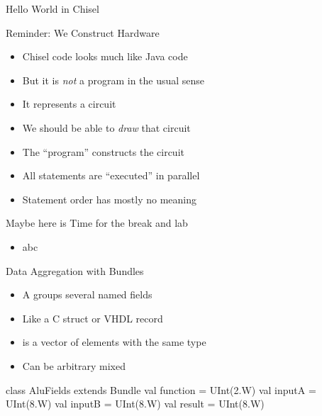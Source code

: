 \begin{frame}[fragile]{Hello World in Chisel}
\end{frame}

\begin{frame}[fragile]{Reminder: We Construct Hardware}
\begin{itemize}
\item Chisel code looks much like Java code
\item But it is \emph{not} a program in the usual sense
\item It represents a circuit
\item We should be able to \emph{draw} that circuit
\item The ``program'' constructs the circuit
\item All statements are ``executed'' in parallel
\item Statement order has mostly no meaning
\end{itemize}
\end{frame}



\begin{frame}[fragile]{Maybe here is Time for the break and lab}
\begin{itemize}
\item abc
\end{itemize}
\end{frame}



\begin{frame}[fragile]{Data Aggregation with Bundles}
\begin{itemize}
\item A  groups several named fields
\item Like a C struct or VHDL record
\item {} is a vector of elements with the same type
\item Can be arbitrary mixed
\end{itemize}
\begin{chisel}
class AluFields extends Bundle {
  val function = UInt(2.W)
  val inputA = UInt(8.W)
  val inputB = UInt(8.W)
  val result = UInt(8.W)
}
\end{chisel}
\end{frame}

